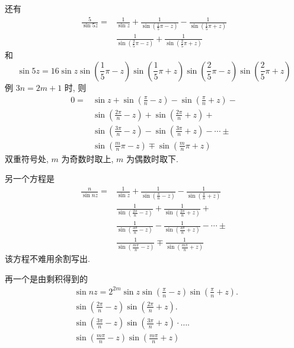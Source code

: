 还有
\[
\begin{aligned}
\frac{5}{\sin 5 z}= & \frac{1}{\sin z}+\frac{1}{\sin \left(\frac{1}{5} \pi-z\right)}-\frac{1}{\sin \left(\frac{1}{5} \pi+z\right)} \\
& \frac{1}{\sin \left(\frac{2}{5} \pi-z\right)}+\frac{1}{\sin \left(\frac{2}{5} \pi+z\right)}
\end{aligned}
\]
和
\[
\sin 5 z=16 \sin z \sin \left(\frac{1}{5} \pi-z\right) \sin \left(\frac{1}{5} \pi+z\right) \sin \left(\frac{2}{5} \pi-z\right) \sin \left(\frac{2}{5} \pi+z\right)
\]
例 $3 n=2 m+1$ 时, 则
\[
\begin{aligned}
0= & \sin z+\sin \left(\frac{\pi}{n}-z\right)-\sin \left(\frac{\pi}{n}+z\right)- \\
& \sin \left(\frac{2 \pi}{n}-z\right)+\sin \left(\frac{2 \pi}{n}+z\right)+ \\
& \sin \left(\frac{3 \pi}{n}-z\right)-\sin \left(\frac{3 \pi}{n}+z\right)-\cdots \pm \\
& \sin \left(\frac{m}{n} \pi-z\right) \mp \sin \left(\frac{m}{n} \pi+z\right)
\end{aligned}
\]
双重符号处, $m$ 为奇数时取上, $m$ 为偶数时取下.

另一个方程是
\[
\begin{aligned}
\frac{n}{\sin n z}= & \frac{1}{\sin z}+\frac{1}{\sin \left(\frac{\pi}{n}-z\right)}-\frac{1}{\sin \left(\frac{\pi}{n}+z\right)} \\
& \frac{1}{\sin \left(\frac{2 \pi}{n}-z\right)}+\frac{1}{\sin \left(\frac{2 \pi}{n}+z\right)}+ \\
& \frac{1}{\sin \left(\frac{3 \pi}{n}-z\right)}-\frac{1}{\sin \left(\frac{3 \pi}{n}+z\right)}-\cdots \pm \\
& \frac{1}{\sin \left(\frac{m \pi}{n}-z\right)} \mp \frac{1}{\sin \left(\frac{m \pi}{n}+z\right)}
\end{aligned}
\]
该方程不难用余割写出.

再一个是由剩积得到的
\[
\begin{aligned}
& \sin n z=2^{2 m} \sin z \sin \left(\frac{\pi}{n}-z\right) \sin \left(\frac{\pi}{n}+z\right) \text {. } \\
& \sin \left(\frac{2 \pi}{n}-z\right) \sin \left(\frac{2 \pi}{n}+z\right) \text {. } \\
& \sin \left(\frac{3 \pi}{n}-z\right) \sin \left(\frac{3 \pi}{n}+z\right) \cdot \ldots . \\
& \sin \left(\frac{m \pi}{n}-z\right) \sin \left(\frac{m \pi}{n}+z\right)
\end{aligned}
\]
